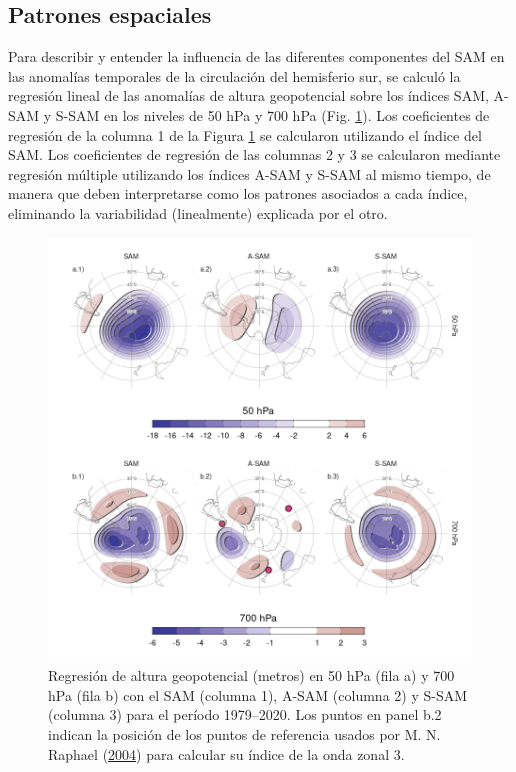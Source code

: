 \documentclass[12pt,oneside,a4paper]{reedthesis}
\begin{document}
\hypertarget{spatial}{%
\subsection{Patrones espaciales}\label{spatial}}

Para describir y entender la influencia de las diferentes componentes del SAM en las anomalías temporales de la circulación del hemisferio sur, se calculó la regresión lineal de las anomalías de altura geopotencial sobre los índices SAM, A-SAM y S-SAM en los niveles de 50 hPa y 700 hPa (Fig. \ref{fig:2d-regr}).
Los coeficientes de regresión de la columna 1 de la Figura \ref{fig:2d-regr} se calcularon utilizando el índice del SAM.
Los coeficientes de regresión de las columnas 2 y 3 se calcularon mediante regresión múltiple utilizando los índices A-SAM y S-SAM al mismo tiempo, de manera que deben interpretarse como los patrones asociados a cada índice, eliminando la variabilidad (linealmente) explicada por el otro.



\begin{figure}

{\centering \includegraphics{figures/30-sam/2d-regr-1} 

}

\caption{Regresión de altura geopotencial (metros) en 50 hPa (fila a) y 700 hPa (fila b) con el SAM (columna 1), A-SAM (columna 2) y S-SAM (columna 3) para el período 1979--2020. Los puntos en panel b.2 indican la posición de los puntos de referencia usados por M. N. Raphael (\protect\hyperlink{ref-raphael2004}{2004}) para calcular su índice de la onda zonal 3.}\label{fig:2d-regr}
\end{figure}
\end{document}
